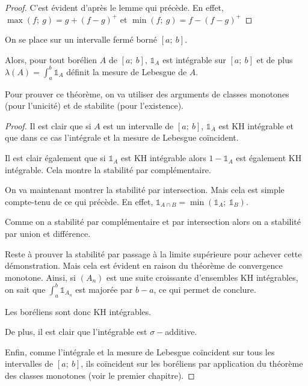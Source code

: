 \begin{proof}
C'est évident d'après le lemme qui précède. En effet, $\max(f;~g) = g+(f-g)^+$ et $\min(f;~g) = f-(f-g)^+$
\end{proof}



\begin{theo}
On se place sur un intervalle fermé borné $[a;~b]$.

Alors, pour tout borélien $A$ de $[a;~b]$, $\mathbb{1}_A$ est intégrable sur $[a;~b]$ et de plus $\lambda(A) = \int_a^b \mathbb{1}_A$ définit la mesure de Lebesgue de $A$.
\end{theo}

Pour prouver ce théorème, on va utiliser des arguments de classes monotones (pour l'unicité) et de stabilite (pour l'existence).

\begin{proof}
Il est clair que si $A$ est un intervalle de $[a;~b]$, $\mathbb{1}_A$ est KH intégrable et que dans ce cas l'intégrale et la mesure de Lebesgue coïncident.

Il est clair également que si $\mathbb{1}_A$ est KH intégrable alors $1-\mathbb{1}_A$ est également KH intégrable. Cela montre la stabilité par complémentaire.

On va maintenant montrer la stabilité par intersection. Mais cela est simple compte-tenu de ce qui précède. En effet, $\mathbb{1}_{A \cap B} = \min(\mathbb{1}_A;~\mathbb{1}_B)$.

Comme on a stabilité par complémentaire et par intersection alors on a stabilité par union et différence.

Reste à prouver la stabilité par passage à la limite supérieure pour achever cette démonstration. Mais cela est évident en raison du théorème de convergence monotone. Ainsi, si $(A_n)$ est une suite croissante d'ensembles KH intégrables, on sait que $\int_a^b \mathbb{1}_{A_n}$ est majorée par $b-a$, ce qui permet de conclure.

Les boréliens sont donc KH intégrables.

De plus, il est clair que l'intégrable est $\sigma-$additive.

Enfin, comme l'intégrale et la mesure de Lebesgue coïncident sur tous les intervalles de $[a;~b]$, ils coïncident sur les boréliens par application du théorème des classes monotones (voir le premier chapitre).
\end{proof}


